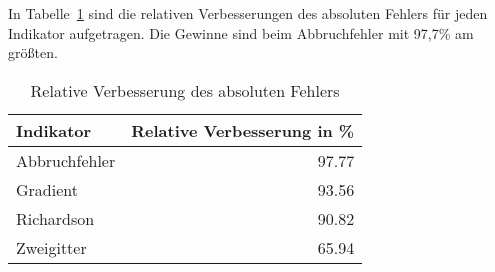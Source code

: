 In Tabelle~\ref{tab:verb} sind die relativen Verbesserungen des absoluten Fehlers für jeden
Indikator aufgetragen. Die Gewinne sind beim Abbruchfehler mit 97,7\% am größten.


\begin{table}[h]
  \begin{tabular}{l r}
  \toprule
  Indikator & Relative Verbesserung in \% \\
  \midrule
      Abbruchfehler & 97.77\\
      Gradient & 93.56\\
      Richardson & 90.82\\
      Zweigitter & 65.94\\
  \bottomrule
\end{tabular}
\caption{Relative Verbesserung des absoluten Fehlers}
\label{tab:verb}
\end{table}
